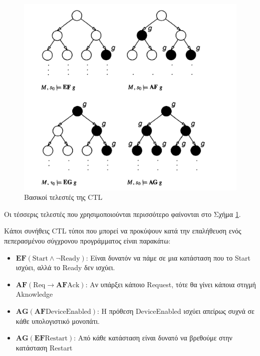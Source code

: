 \documentclass{article}
\newcommand{\english}[1]{\foreignlanguage{english}{{#1}}}
\begin{document}
\begin{figure}
    \includegraphics[width=\textwidth]{figure.png}
    \centering
    \caption{Βασικοί τελεστές της \english{CTL}}
    \label{fig:ops}
\end{figure}

Οι τέσσερις τελεστές που χρησιμοποιούνται περισσότερο φαίνονται στο Σχήμα \ref{fig:ops}.

Κάποι συνήθεις \english{CTL} τύποι που μπορεί να προκύψουν κατά την επαλήθευση ενός πεπερασμένου σύγχρονου προγράμματος είναι παρακάτω:

\begin{itemize}
    \item \english{$\mathbf{EF}(\text{Start} \wedge \neg \text{Ready})$}: Είναι δυνατόν να πάμε σε μια κατάσταση που το \english{Start} ισχύει, αλλά το \english{Ready} δεν ισχύει.
    \item \english{$\mathbf{AF}(\text{Req} \rightarrow \mathbf{AF} \text{Ack})$}: Αν υπάρξει κάποιο \english{Request}, τότε θα γίνει κάποια στιγμή \english{Aknowledge}
    \item \english{$\mathbf{AG}(\mathbf{AF} \text{DeviceEnabled})$}: Η πρόθεση \english{DeviceEnabled} ισχύει απείρως συχνά σε κάθε υπολογιστικό μονοπάτι.
    \item \english{$\mathbf{AG}(\mathbf{EF} \text{Restart})$}: Από κάθε κατάσταση είναι δυνατό να βρεθούμε στην κατάσταση \english{Restart} 
\end{itemize} 
\end{document}
